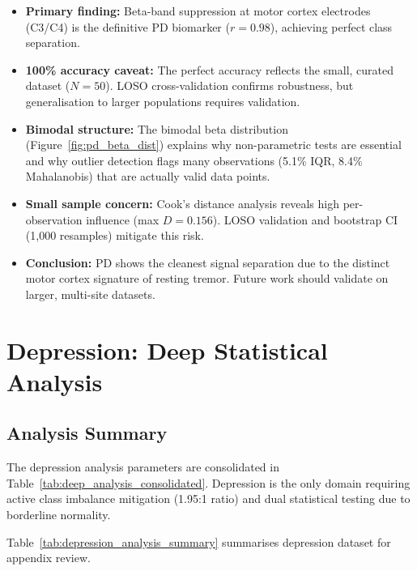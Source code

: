 \begin{itemize}
\item \textbf{Primary finding:} Beta-band suppression at motor cortex electrodes (C3/C4) is the definitive PD biomarker ($r = 0.98$), achieving perfect class separation.
\item \textbf{100\% accuracy caveat:} The perfect accuracy reflects the small, curated dataset ($N = 50$). LOSO cross-validation confirms robustness, but generalisation to larger populations requires validation.
\item \textbf{Bimodal structure:} The bimodal beta distribution (Figure~\ref{fig:pd_beta_dist}) explains why non-parametric tests are essential and why outlier detection flags many observations (5.1\% IQR, 8.4\% Mahalanobis) that are actually valid data points.
\item \textbf{Small sample concern:} Cook's distance analysis reveals high per-observation influence (max $D = 0.156$). LOSO validation and bootstrap CI (1,000 resamples) mitigate this risk.
\item \textbf{Conclusion:} PD shows the cleanest signal separation due to the distinct motor cortex signature of resting tremor. Future work should validate on larger, multi-site datasets.
\end{itemize}

\section{Depression: Deep Statistical Analysis}
\label{app:deep_depression}

\subsection{Analysis Summary}

The depression analysis parameters are consolidated in Table~\ref{tab:deep_analysis_consolidated}. Depression is the only domain requiring active class imbalance mitigation (1.95:1 ratio) and dual statistical testing due to borderline normality.

\iffalse %
\label{tab:depression_analysis_summary}
\noindent Table~\ref{tab:depression_analysis_summary} summarises depression dataset for appendix review.


